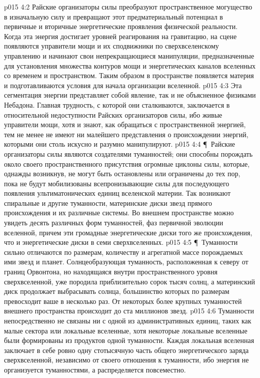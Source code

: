 \vs p015 4:2 Райские организаторы силы преобразуют пространственное могущество в изначальную силу и превращают этот предматериальный потенциал в первичные и вторичные энергетические проявления физической реальности. Когда эта энергия достигает уровней реагирования на гравитацию, на сцене появляются управители мощи и их сподвижники по сверхвселенскому управлению и начинают свои непрекращающиеся манипуляции, предназначенные для установления множества контуров мощи и энергетических каналов вселенных со временем и пространством. Таким образом в пространстве появляется материя и подготавливаются условия для начала организации вселенной.
\vs p015 4:3 Эта сегментация энергии представляет собой явление, так и не объясненное физиками Небадона. Главная трудность, с которой они сталкиваются, заключается в относительной недоступности Райских организаторов силы, ибо живые управители мощи, хотя и знают, как обращаться с пространственной энергией, тем не менее не имеют ни малейшего представления о происхождении энергий, которыми они столь искусно и разумно манипулируют.
\vs p015 4:4 \P\ Райские организаторы силы являются создателями туманностей; они способны порождать около своего пространственного присутствия огромные циклоны силы, которые, однажды возникнув, не могут быть остановлены или ограничены до тех пор, пока не будут мобилизованы всепронизывающие силы для последующего появления ультиматонических единиц вселенской материи. Так возникают спиральные и другие туманности, материнские диски звезд прямого происхождения и их различные системы. Во внешнем пространстве можно увидеть десять различных форм туманностей, фаз первичной эволюции вселенной, причем эти громадные энергетические диски того же происхождения, что и энергетические диски в семи сверхвселенных.
\vs p015 4:5 \P\ Туманности сильно отличаются по размерам, количеству и агрегатной массе порождаемых ими звезд и планет. Солнцеобразующая туманность, расположенная к северу от границ Орвонтона, но находящаяся внутри пространственного уровня сверхвселенной, уже породила приблизительно сорок тысяч солнц, а материнский диск продолжает выбрасывать солнца, большинство которых по размерам превосходит ваше в несколько раз. От некоторых более крупных туманностей внешнего пространства происходит до ста миллионов звезд.
\vs p015 4:6 Туманности непосредственно не связаны ни с одной из административных единиц, таких как малые сектора или локальные вселенные, хотя некоторые локальные вселенные были формированы из продуктов одной туманности. Каждая локальная вселенная заключает в себе ровно одну стотысячную часть общего энергетического заряда сверхвселенной, независимо от своего отношения к туманности, ибо энергия не организуется туманностями, а распределяется повсеместно.
